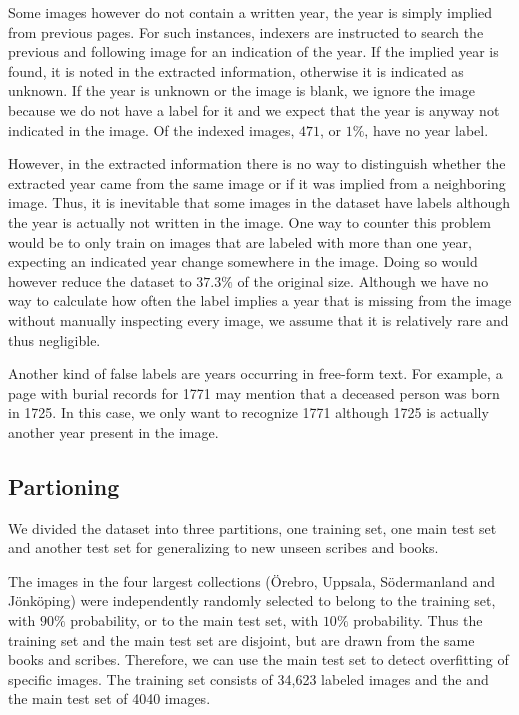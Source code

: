 Some images however do not contain a written year, the year is simply implied from previous pages. For such instances, indexers are instructed to search the previous and following image for an indication of the year. If the implied year is found, it is noted in the extracted information, otherwise it is indicated as unknown.
If the year is unknown or the image is blank, we ignore the image because we do not have a label for it and we expect that the year is anyway not indicated in the image. Of the indexed images, $471$, or $1\%$, have no year label.

However, in the extracted information there is no way to distinguish whether the extracted year came from the same image or if it was implied from a neighboring image. Thus, it is inevitable that some images in the dataset have labels although the year is actually not written in the image. One way to counter this problem would be to only train on images that are labeled with more than one year, expecting an indicated year change somewhere in the image. Doing so would however reduce the dataset to $37.3\%$ of the original size.
Although we have no way to calculate how often the label implies a year that is missing from the image without manually inspecting every image, we assume that it is relatively rare and thus negligible.

Another kind of false labels are years occurring in free-form text. For example, a page with burial records for 1771 may mention that a deceased person was born in 1725. In this case, we only want to recognize 1771 although 1725 is actually another year present in the image.

\subsection{Partioning}

We divided the dataset into three partitions, one training set, one main test set and another test set for generalizing to new unseen scribes and books.

The images in the four largest collections (Örebro, Uppsala, Södermanland and Jönköping) were independently randomly selected to belong to the training set, with $90\%$ probability, or to the main test set, with $10\%$ probability.
Thus the training set and the main test set are disjoint, but are drawn from the same books and scribes. Therefore, we can use the main test set to detect overfitting of specific images.
The training set consists of 34,623 labeled images and the and the main test set of 4040 images.


